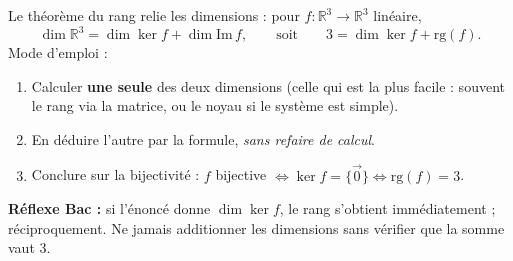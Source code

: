 \documentclass[11pt]{article}
\newcommand{\cle}[1]{{\popxbold\color{popdark}#1}}
\begin{document}
\begin{methode}[Exploiter $\dim E=\dim\ker f+\dim\mathrm{Im}\,f$]
Le \cle{théorème du rang} relie les dimensions : pour $f:\mathbb{R}^3\to\mathbb{R}^3$ linéaire,
\[
\dim\mathbb{R}^3=\dim\ker f+\dim\mathrm{Im}\,f,\qquad\text{soit}\qquad 3=\dim\ker f+\mathrm{rg}(f).
\]
Mode d'emploi :
\begin{enumerate}
\item Calculer \textbf{une seule} des deux dimensions (celle qui est la plus facile : souvent le rang via la matrice, ou le noyau si le système est simple).
\item En déduire l'autre par la formule, \emph{sans refaire de calcul}.
\item Conclure sur la bijectivité : $f$ bijective $\Leftrightarrow \ker f=\{\vec{0}\} \Leftrightarrow \mathrm{rg}(f)=3$.
\end{enumerate}
\textbf{Réflexe Bac :} si l'énoncé donne $\dim\ker f$, le rang s'obtient immédiatement ; réciproquement. Ne jamais additionner les dimensions sans vérifier que la somme vaut 3.
\end{methode}
\end{document}

